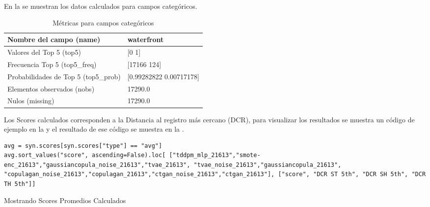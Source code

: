 \newpage
En la  se muestran los datos calculados para campos categóricos.

\begin{table}[H]
    \centering
    \caption{Métricas para campos categóricos}
    \label{metricas-categoricas}
    \begin{tabular}{|m{10em}|m{25em}|}
    \hline
    \rowcolor[gray]{0.8}
    Nombre del campo (name) & waterfront \\ \hline
    Valores del Top 5 (top5) & [0 1] \\ \hline
    Frecuencia Top 5 (top5\_freq) & [17166   124] \\ \hline
    Probabilidades de Top 5 (top5\_prob) & [0.99282822 0.00717178] \\ \hline
    Elementos observados (nobs) & 17290.0 \\ \hline
    Nulos (missing) & 17290.0 \\ \hline
\end{tabular}
\end{table}

Los Scores calculados corresponden a la Distancia al registro más cercano (DCR), para visualizar los resultados se muestra un código de ejemplo en la  y el resultado de ese código se muestra en la .

\begin{listing}[H]
    \begin{verbatim}
avg = syn.scores[syn.scores["type"] == "avg"]
avg.sort_values("score", ascending=False).loc[ ["tddpm_mlp_21613","smote-enc_21613","gaussiancopula_noise_21613","tvae_21613", "tvae_noise_21613","gaussiancopula_21613", "copulagan_noise_21613","copulagan_21613","ctgan_noise_21613","ctgan_21613"], ["score", "DCR ST 5th", "DCR SH 5th", "DCR TH 5th"]]
    \end{verbatim}
\caption{Mostrando Scores Promedios Calculados}
\label{codigo-show-score}
\end{listing}

